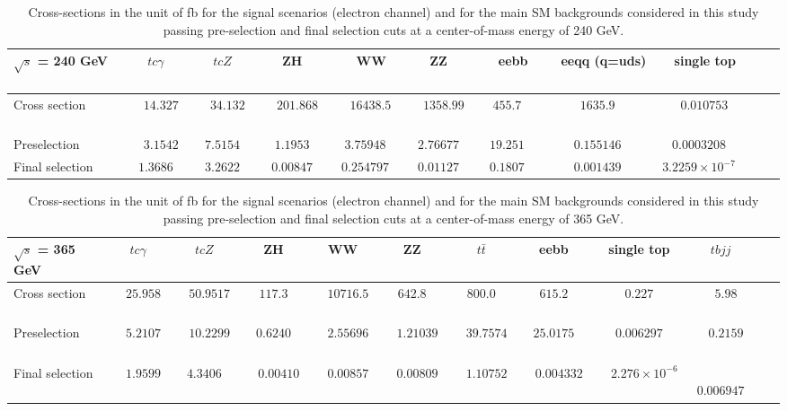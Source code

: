\documentclass[11pt,onecolumn,english,showpacs,preprintnumbers,amsmath,amssymb,floatfix,nofootinbib]{revtex4-1}
\begin{document}
\begin{table}[htbp]
\begin{center}
\begin{tabular}{l|c c c c c c  c c c c c  }  \hline
$\sqrt {s}$ = 240 GeV   ~&~ $tc\gamma$  ~&~ $tcZ$   ~&  ~  ZH     ~&  ~ WW  &  ~  ZZ ~ &~ eebb ~&~ eeqq (q=uds) ~&~ single top  \\  \hline
Cross section    ~&~  $14.327$  ~&~ $34.132$  ~&~    $201.868$        ~&~  $16438.5$   ~&~    $1358.99$  ~&~  $455.7$ ~&~  $1635.9$  ~&~  $0.010753$       \\ 
Preselection    ~&~  $3.1542$  & $7.5154$  &    $1.1953$        &  $3.75948$   &    $2.76677$  &  $19.251$ &  $0.155146$  &  $0.0003208$        \\ 
Final selection
  &  $1.3686$  & $3.2622$  &    $0.00847$        &  $0.254797$   &    $0.01127$  &  $0.1807$ &  $0.001439$  &  $3.2259\times10^{-7}$       \\   \hline  \hline
\end{tabular}
\end{center}
\caption{Cross-sections in the unit of fb for the signal scenarios 
(electron channel) and for the main SM backgrounds considered in this study 
passing pre-selection and final selection cuts at a center-of-mass energy of 240 GeV.}
\label{bkg-240}
\end{table}






\begin{table}[htbp]
\begin{center}
\begin{tabular}{l|c c c c  c c  c c c c c  }  \hline
$\sqrt {s}$ = 365 GeV      & $tc\gamma$  & $tcZ$   & ZH   &  WW  & ZZ & $t \bar{t}$ & eebb & single top & $tbjj$  \\  \hline
Cross section    ~&~  $25.958$  ~&~  $50.9517$    ~&~  $117.3$ ~&~    $10716.5$     ~&~  $642.8$  ~&~ $800.0$        ~&~  $615.2$  ~&~  $0.227$  ~&~ $5.98$       \\ 
Preselection    ~&~  $5.2107$  ~&~  $10.2299$    ~&~  $0.6240$ ~&~  $2.55696$     ~&~  $1.21039$  ~&~ $39.7574$    ~&~  $25.0175$  ~&~  $0.006297$  ~&~ $0.2159$       \\ 
Final selection    ~&~  $1.9599$  ~&~  $4.3406$    ~&~  $0.00410$ ~&~ $0.00857$  ~&~  $0.00809$  ~&~ $1.10752$  ~&~  $0.004332$  ~&~ $2.276\times 10^{-6}$  ~&~ $0.006947$       \\  \hline  \hline
\end{tabular}
\end{center}
\caption{Cross-sections in the unit of fb for the signal scenarios (electron channel) and 
for the main SM backgrounds considered in this study passing pre-selection 
and final selection cuts at a center-of-mass energy of 365 GeV.}
\label{bkg-365}
\end{table}
\end{document}
